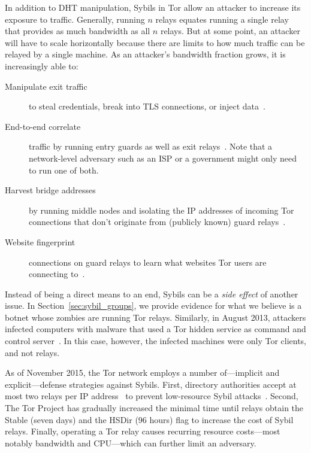 In addition to DHT manipulation, Sybils in Tor allow an attacker to increase its
exposure to traffic.  Generally, running $n$ relays equates running a single
relay that provides as much bandwidth as all $n$ relays.  But at some point, an
attacker will have to scale horizontally because there are limits to how much
traffic can be relayed by a single machine.  As an attacker's bandwidth fraction
grows, it is increasingly able to:
\begin{description}
	\item[Manipulate exit traffic] to steal credentials, break into TLS
		connections, or inject data~\cite{Winter2014a}.
	\item[End-to-end correlate] traffic by running entry guards as well as exit
		relays~\cite{Johnson2013a}.  Note that a network-level adversary such as
		an ISP or a government might only need to run one of both.
	\item[Harvest bridge addresses] by running middle nodes and isolating the
		IP addresses of incoming Tor connections that don't originate from
		(publicly known) guard relays~\cite{Ling2012a}.
	\item[Website fingerprint] connections on guard relays to learn what
		websites Tor users are connecting to~\cite{Juarez2014a}.
\end{description}

Instead of being a direct means to an end, Sybils can be a \emph{side effect}
of another issue.  In Section~\ref{sec:sybil_groups}, we provide evidence for
what we believe is a botnet whose zombies are running Tor relays.  Similarly,
in August 2013, attackers infected computers with malware that used a Tor
hidden service as command and control server~\cite{Hopper2014a}.  In this case,
however, the infected machines were only Tor clients, and not relays.

As of November 2015, the Tor network employs a number of---implicit and
explicit---defense strategies against Sybils.  First, directory authorities
accept at most two relays per IP address~\cite{Bauer2007b} to prevent
low-resource Sybil attacks~\cite{Bauer2007a}.  Second, The Tor Project has
gradually increased the minimal time until relays obtain the Stable (seven days)
and the HSDir (96 hours) flag to increase the cost of Sybil relays.  Finally,
operating a Tor relay causes recurring resource costs---most notably bandwidth
and CPU---which can further limit an adversary.

